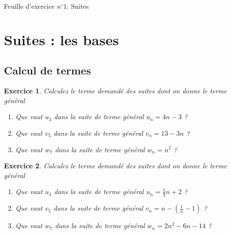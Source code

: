 \documentclass[10pt,a4paper]{article}
\title{}
\makeatletter
\newtheorem{exo}{Exercice}
\newlength{\longA}
\newlength{\longB}
\newenvironment{BoiteShadow}[3][\linewidth]{%
\addtolength{\longA}{#2}
\addtolength{\longB}{#3}
\begin{Sbox}\begin{minipage}{#1}}%
{\end{minipage}\end{Sbox}%
\setlength{\fboxsep}{\longA}
\setlength{\shadowsize}{\longB}
\shadowbox{\unhbox\@Sbox}\par}
\makeatother
\begin{document}
\begin{BoiteShadow}{10pt}{8pt}
\Huge{Feuille d'exercice $n^{\circ}1$: Suites}
 \end{BoiteShadow}


\section{Suites : les bases}

\subsection{Calcul de termes}

\begin{exo}
    Calculez le terme demandé des suites dont on donne le terme général
    \begin{enumerate}
        \item Que vaut $u_3$ dans la suite de terme général $u_n = 4n-3$ ?
        \item Que vaut $v_5$ dans la suite de terme général $v_n = 13-3n$ ?
        \item Que vaut $w_7$ dans la suite de terme général $w_n = n^2$ ?
    \end{enumerate}
\end{exo}

\begin{exo}
    Calculez le terme demandé des suites dont on donne le terme général
    \begin{enumerate}
        \item Que vaut $u_3$ dans la suite de terme général $u_n = \frac{1}{3}n + 2$ ?
        \item Que vaut $v_5$ dans la suite de terme général $v_n = n-(\frac{1}{n}-1)$ ?
        \item Que vaut $w_7$ dans la suite de terme général $w_n = 2n^2 - 6n - 14$ ?
    \end{enumerate}
\end{exo}
\end{document}
